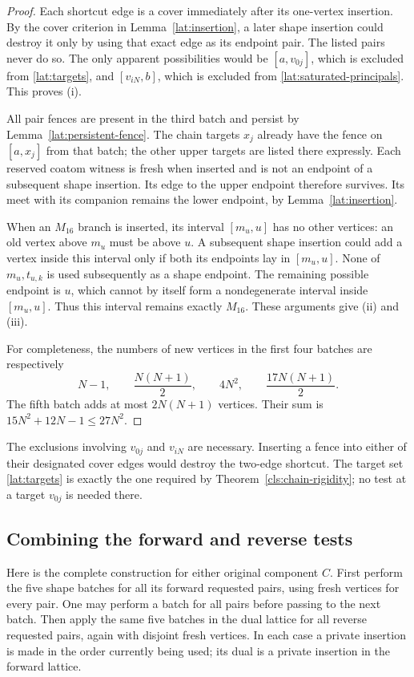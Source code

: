 \begin{proof}
Each shortcut edge is a cover immediately after its one-vertex
insertion.  By the cover criterion in Lemma~\ref{lat:insertion}, a
later shape insertion could destroy it only by using that exact edge
as its endpoint pair.  The listed pairs never do so.  The only apparent
possibilities would be $[a,v_{0j}]$, which is excluded from
\eqref{lat:targets}, and $[v_{iN},b]$, which is excluded from
\eqref{lat:saturated-principals}.  This proves (i).

All pair fences are present in the third batch and persist by
Lemma~\ref{lat:persistent-fence}.  The chain targets $x_j$ already have
the fence on $[a,x_j]$ from that batch; the other upper targets are
listed there expressly.  Each reserved coatom witness is fresh when
inserted and is not an endpoint of a subsequent shape insertion.
Its edge to the upper endpoint therefore survives.  Its meet with its
companion remains the lower endpoint, by
Lemma~\ref{lat:insertion}.

When an $M_{16}$ branch is inserted, its interval $[m_u,u]$ has no
other vertices: an old vertex above $m_u$ must be above $u$.
A subsequent shape insertion could add a vertex inside this interval
only if both its endpoints lay in $[m_u,u]$.  None of $m_u,t_{u,k}$
is used subsequently as a shape endpoint.  The remaining possible
endpoint is $u$, which cannot by itself form a nondegenerate interval
inside $[m_u,u]$.  Thus this interval remains exactly $M_{16}$.
These arguments give (ii) and (iii).

For completeness, the numbers of new vertices in the first four
batches are respectively
\[
 N-1,\qquad \frac{N(N+1)}2,\qquad 4N^2,
 \qquad \frac{17N(N+1)}2.
\]
The fifth batch adds at most $2N(N+1)$ vertices.  Their sum is
$15N^2+12N-1\leq27N^2$.
\end{proof}

The exclusions involving $v_{0j}$ and $v_{iN}$ are necessary.
Inserting a fence into either of their designated cover edges would
destroy the two-edge shortcut.  The target set
\eqref{lat:targets} is exactly the one required by
Theorem~\ref{cls:chain-rigidity}; no test at a target $v_{0j}$ is
needed there.

\subsection{Combining the forward and reverse tests}

Here is the complete construction for either original component $C$.
First perform the five shape batches for all its forward requested
pairs, using fresh vertices for every pair.  One may perform a batch
for all pairs before passing to the next batch.  Then apply the same
five batches in the dual lattice for all reverse requested pairs,
again with disjoint fresh vertices.  In each case a
private insertion is made in the order currently being used; its dual
is a private insertion in the forward lattice.

